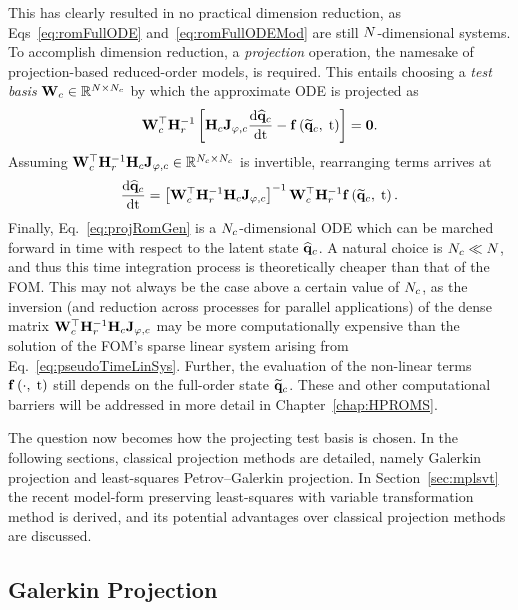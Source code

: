 This has clearly resulted in no practical dimension reduction, as Eqs~\ref{eq:romFullODE} and~\ref{eq:romFullODEMod} are still $N$-dimensional systems. To accomplish dimension reduction, a \textit{projection} operation, the namesake of projection-based reduced-order models, is required. This entails choosing a \textit{test basis} $\testBasisCons \inRTwo{\numDOF}{\numConsModes}$ by which the approximate ODE is projected as
%
\begin{equation}\label{eq:contRomRes}
    \testBasisCons^\top \resScaleInv \left[\consScale \jacobTrialCons \ode{\consVecCoef}{\timeVar} - \rhsFunc{\consVecRom, \; \timeVar} \right] = \zeroVec.
\end{equation}
%
Assuming $\testBasisCons^\top \resScaleInv \consScale \jacobTrialCons \inRTwo{\numConsModes}{\numConsModes}$ is invertible, rearranging terms arrives at
%
\begin{equation}\label{eq:projRomGen}
    \ode{\consVecCoef}{\timeVar} = \left[\testBasisCons^\top \resScaleInv \consScale \jacobTrialCons\right]^{-1} \testBasisCons^\top \resScaleInv \rhsFunc{\consVecRom, \; \timeVar}.
\end{equation}
%
Finally, Eq.~\ref{eq:projRomGen} is a $N_c$-dimensional ODE which can be marched forward in time with respect to the latent state $\mathbf{\widehat{q}}_{c}$. A natural choice is $N_c \ll N$, and thus this time integration process is theoretically cheaper than that of the FOM. This may not always be the case above a certain value of $N_c$, as the inversion (and reduction across processes for parallel applications) of the dense matrix $\testBasisCons^\top \resScaleInv \consScale \jacobTrialCons$ may be more computationally expensive than the solution of the FOM's sparse linear system arising from Eq.~\ref{eq:pseudoTimeLinSys}. Further, the evaluation of the non-linear terms $\mathbf{f} \left(\cdot, \; \text{t}\right)$ still depends on the full-order state $\mathbf{\widetilde{q}}_{c}$. These and other computational barriers will be addressed in more detail in Chapter~\ref{chap:HPROMS}.

The question now becomes how the projecting test basis is chosen. In the following sections, classical projection methods are detailed, namely Galerkin projection and least-squares Petrov--Galerkin projection. In Section~\ref{sec:mplsvt} the recent model-form preserving least-squares with variable transformation method is derived, and its potential advantages over classical projection methods are discussed.

\subsection{Galerkin Projection}

